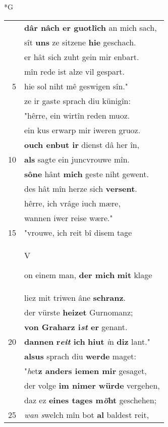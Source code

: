 \documentclass[8pt,a4paper,notitlepage]{article}
\begin{document}
\newpage
\begin{table}[ht]
\begin{minipage}[t]{0.5\linewidth}
\small
\begin{center}*G
\end{center}
\begin{tabular}{rl}
 & \textbf{dâr nâch er guotlîch} an mich sach,\\ 
 & sît \textbf{uns} ze sitzene \textbf{hie} geschach.\\ 
 & er hât sich zuht gein mir enbart.\\ 
 & mîn rede ist alze vil gespart.\\ 
5 & hie sol niht mê geswigen sîn."\\ 
 & ze ir gaste sprach diu künigîn:\\ 
 & "hêrre, ein wirtîn reden muoz.\\ 
 & ein kus erwarp mir iweren gruoz.\\ 
 & \textbf{ouch enbut ir} dienst dâ her în,\\ 
10 & \textbf{als} sagte ein juncvrouwe mîn.\\ 
 & \textbf{sône} hânt \textbf{mich} geste niht gewent.\\ 
 & des hât mîn herze sich \textbf{versent}.\\ 
 & hêrre, ich vrâge iuch mære,\\ 
 & wannen iwer reise wære."\\ 
15 & "vrouwe, ich reit bî disem tage\\ 
 & \begin{large}V\end{large}on einem man, \textbf{der mich} \textbf{mit} klage\\ 
 & liez mit triwen âne \textbf{schranz}.\\ 
 & der vürste \textbf{heizet} Gurnomanz;\\ 
 & \textbf{von Graharz i\textit{st} er} genant.\\ 
20 & \textbf{dannen} \textbf{r\textit{eit} ich} \textbf{hiut} \textit{i}n \textbf{diz} lant."\\ 
 & \textbf{alsus} sprach diu \textbf{werde} maget:\\ 
 & "\textit{h}et\textbf{z anders iemen mir} gesaget,\\ 
 & der volge \textbf{im nimer würde} vergehen,\\ 
 & daz ez \textbf{eines tages m\textit{ö}ht} geschehen;\\ 
25 & \textit{wan} \textit{s}welch mîn bot \textbf{al} baldest reit,\\ 

\end{tabular}
\end{minipage}
\end{table}
\end{document}
